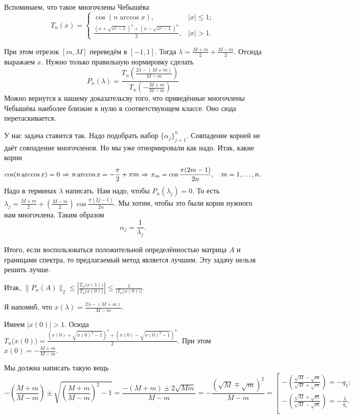 Вспоминаем, что такое многочлены Чебышёва
\[
  T_n(x) = \begin{cases}
  \cos(n\arccos x),& |x|\le 1;\\
  \frac{(x+\sqrt{x^2-1})^n + (x - \sqrt{x^2-1})^n}{2},& |x|>1.
\end{cases}
\]

При этом отрезок $[m,M]$ переведём в $[-1,1]$. Тогда $\lambda = \frac{M+m}{2} + \frac{M-m}{2}$. Отсюда выражаем $x$. Нужно только правильную нормировку сделать
\[
  P_n(\lambda) = \frac{T_n\left( \frac{2\lambda - (M+m)}{M-m} \right)}{T_n\left( -\frac{M+m}{M-m} \right)}
\]
Можно вернутся к нашему доказательсву того, что приведённые многочлены Чебышёва наиболее близкие к нулю в соответствующем классе. Оно сюда перетаскивается.

У нас задача ставится так. Надо подобрать набор $\{\alpha_j\}_{j=1}^n$. Совпадение корней не даёт совпадение многочленов. Но мы уже отнормировали как надо. Итак, какие корни
\[
  \cos(n\arccos x) = 0\hspace{1pt plus1pt}\Rightarrow\hspace{1pt plus1pt} n\arccos x = -\frac\pi2 + \pi m\hspace{1pt plus1pt}\Rightarrow\hspace{1pt plus1pt} x_m = \cos\frac{\pi(2m-1)}{2n},\quad m=1,\dots,n.
\]
Надо в терминах $\lambda$ написать. Нам надо, чтобы $P_n(\lambda_j) = 0$. То есть $\lambda_j = \frac{M+m}2 + \left( \frac{M-m}2 \right)\cos\frac{\pi(2j-1)}{2n}$. Мы хотим, чтобы это были корни нужного нам многочлена. Таким образом
\[
  \alpha_j = \frac1{\lambda_j}.
\]

Итого, если воспользоваться положительной определённостью матрица $A$ и границами спектра, то предлагаемый метод является лучшим. Эту задачу нельзя решить лучше.

Итак, $\|P_n(A)\|_2\le \left|\frac{T_n\big(x(\lambda)\big)}{T_n\big(x(0)\big)}\right|\le \frac1{\Big|T_n\big(x(0)\big)\Big|}$.

Я напомнб, что $x(\lambda) = \frac{2\lambda - (M+m)}{M-m}$.

Имеем $\big|x(0)\big|>1$. Осюда $T_n\big(x(0)\big) = \frac{\left( x(0) + \sqrt{ x(0)^2 - 1} \right)^n + \left( x(0) - \sqrt{x(0)^2 -1} \right)^n}2$. При этом $x(0) = -\frac{M+m}{M-m}$.

Мы должна написать такую вещь
\[
  -\left( \frac{M+m}{M-m} \right)\pm \sqrt{ \left(\frac{M+m}{M-m}\right)^2-1} = \frac{-(M+m)\pm 2\sqrt{Mm}}{M-m} = 
 - \frac{\left( \sqrt{M}\mp\sqrt{m} \right)^2}{M-m} =
 \left[
  \begin{aligned}
    -\left( \frac{\sqrt{M} - \sqrt{m}}{\sqrt{M}+\sqrt{m}} \right) = -q_1;\\
    -\left( \frac{\sqrt{M} + \sqrt{m}}{\sqrt{M}-\sqrt{m}} \right) = -\frac1{q_1}.\\
  \end{aligned}
\right. 
\]

